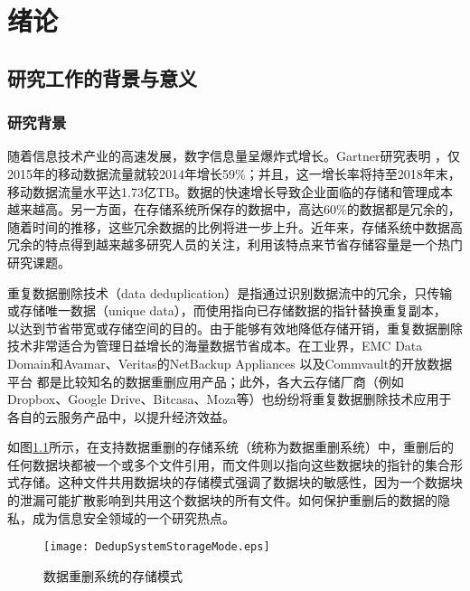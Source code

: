 \chapter{绪\hspace{6pt}论}

\section{研究工作的背景与意义}
\subsection{研究背景}

随着信息技术产业的高速发展，数字信息量呈爆炸式增长。Gartner研究表明 ，仅2015年的移动数据流量就较2014年增长59\%；并且，这一增长率将持至2018年末，移动数据流量水平达1.73亿TB。数据的快速增长导致企业面临的存储和管理成本越来越高。另一方面，在存储系统所保存的数据中，高达60\%的数据都是冗余的，随着时间的推移，这些冗余数据的比例将进一步上升。近年来，存储系统中数据高冗余的特点得到越来越多研究人员的关注，利用该特点来节省存储容量是一个热门研究课题。

重复数据删除技术（data deduplication）是指通过识别数据流中的冗余，只传输或存储唯一数据（unique data），而使用指向已存储数据的指针替换重复副本， 以达到节省带宽或存储空间的目的。由于能够有效地降低存储开销，重复数据删除技术非常适合为管理日益增长的海量数据节省成本。在工业界，EMC Data Domain和Avamar、Veritas的NetBackup Appliances 以及Commvault的开放数据平台 都是比较知名的数据重删应用产品；此外，各大云存储厂商（例如 Dropbox、Google Drive、Bitcasa、Moza等）也纷纷将重复数据删除技术应用于各自的云服务产品中，以提升经济效益。

如图\ref{fig:数据重删系统的存储模式}所示，在支持数据重删的存储系统（统称为数据重删系统）中，重删后的任何数据块都被一个或多个文件引用，而文件则以指向这些数据块的指针的集合形式存储。这种文件共用数据块的存储模式强调了数据块的敏感性，因为一个数据块的泄漏可能扩散影响到共用这个数据块的所有文件。如何保护重删后的数据的隐私，成为信息安全领域的一个研究热点。

\begin{figure}[!htb]
    \small
    \centering
    \texttt{[image: DedupSystemStorageMode.eps]}
    \caption{数据重删系统的存储模式} 
    \label{fig:数据重删系统的存储模式}
\end{figure}

